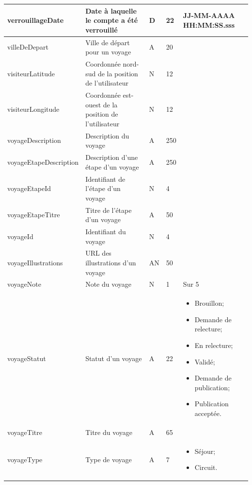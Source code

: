 \documentclass[12pt]{report}
\begin{document}
\begin{longtable}{|p{4cm}|p{4cm}|p{1cm}|p{1cm}|p{4cm}|}
				\hline
				verrouillageDate & Date à laquelle le compte a été verrouillé & D & 22 & JJ-MM-AAAA HH:MM:SS.sss \\						
				\hline
				villeDeDepart & Ville de départ pour un voyage & A & 20 & \\						
				\hline
				visiteurLatitude & Coordonnée nord-sud de la position de l'utilisateur & N & 12 & \\						
				\hline
				visiteurLongitude & Coordonnée est-ouest de la position de l'utilisateur & N & 12 & \\						
				\hline
				voyageDescription & Description du voyage & A & 250 & \\						
				\hline
				voyageEtapeDescription & Description d'une étape d'un voyage & A & 250 & \\						
				\hline
				voyageEtapeId & Identifiant de l'étape d'un voyage & N & 4 & \\						
				\hline
				voyageEtapeTitre & Titre de l'étape d'un voyage & A & 50 & \\						
				\hline
				voyageId & Identifiant du voyage & N & 4 & \\						
				\hline
				voyageIllustrations & URL des illustrations d'un voyage & AN & 50 & \\						
				\hline
				voyageNote & Note du voyage & N & 1 & Sur 5 \\						
				\hline
				voyageStatut & Statut d'un voyage & A & 22 & \begin{itemize} \item Brouillon; \item Demande de relecture; \item En relecture; \item Validé; \item Demande de publication; \item Publication acceptée. \end{itemize} \\						
				\hline
				voyageTitre & Titre du voyage & A & 65 & \\						
				\hline
				voyageType & Type de voyage & A & 7 & \begin{itemize} \item Séjour; \item Circuit. \end{itemize} \\						
				\hline

				\end{longtable}
\end{document}
